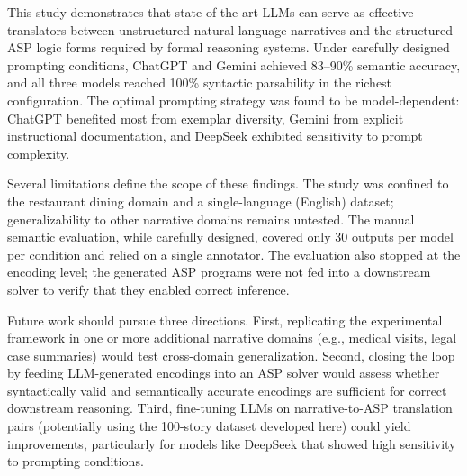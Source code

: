\documentclass[runningheads]{llncs}
\begin{document}
This study demonstrates that state-of-the-art LLMs can serve as effective
translators between unstructured natural-language narratives and the
structured ASP logic forms required by formal reasoning systems.  Under
carefully designed prompting conditions, ChatGPT and Gemini achieved 83--90\%
semantic accuracy, and all three models reached 100\% syntactic parsability in
the richest configuration.  The optimal prompting strategy was found to be
model-dependent: ChatGPT benefited most from exemplar diversity, Gemini from
explicit instructional documentation, and DeepSeek exhibited sensitivity to
prompt complexity.

Several limitations define the scope of these findings.  The study was
confined to the restaurant dining domain and a single-language (English)
dataset; generalizability to other narrative domains remains untested.  The
manual semantic evaluation, while carefully designed, covered only 30 outputs
per model per condition and relied on a single annotator.  The evaluation also
stopped at the encoding level; the generated ASP programs were not fed into a
downstream solver to verify that they enabled correct inference.

Future work should pursue three directions.  First, replicating the
experimental framework in one or more additional narrative domains (e.g.,
medical visits, legal case summaries) would test cross-domain generalization.
Second, closing the loop by feeding LLM-generated encodings into an ASP solver
would assess whether syntactically valid and semantically accurate encodings
are sufficient for correct downstream reasoning.  Third, fine-tuning LLMs
on narrative-to-ASP translation pairs (potentially using the 100-story
dataset developed here) could yield improvements, particularly for models
like DeepSeek that showed high sensitivity to prompting conditions.

%
%
%


\end{document}
